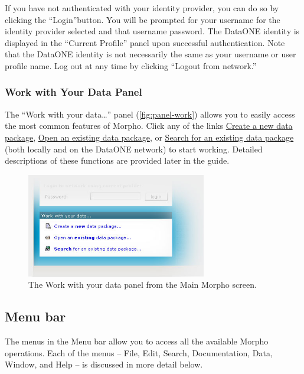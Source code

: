 If you have not authenticated with your identity provider, you can do so 
by clicking the ``Login''button. 
You will be prompted for your username for the identity provider selected and 
that username password. The DataONE identity is displayed in the
``Current Profile'' panel upon successful authentication. Note that the DataONE identity is not necessarily
the same as your username or user profile name. Log out at any time by clicking 
``Logout from network.''

\subsubsection[Work with your data\ldots]{Work with Your Data Panel}
\label{sec:panel-work}

The ``Work with your data\ldots'' panel (\autoref{fig:panel-work})
allows you to easily access the most common features of Morpho. Click
any of the links \hyperref[sec:creating]{Create a new data package},
\hyperref[sec:viewing]{Open an existing data package}, or
\hyperref[sec:searching]{Search for an existing data package} (both
locally and on the DataONE network) to start working. Detailed descriptions
of these functions are provided later in the guide.

\begin{figure}
  \centering
    \includegraphics[width=0.7\textwidth]{images/panel-work.jpg}
  \caption{The Work with your data panel from the Main Morpho screen.}
  \label{fig:panel-work}
\end{figure}


\subsection{Menu bar} \label{sec:menu-bar}

The menus in the Menu bar allow you to access all the available Morpho
operations. Each of the menus -- File, Edit, Search, Documentation,
Data, Window, and Help -- is discussed in more detail below.

